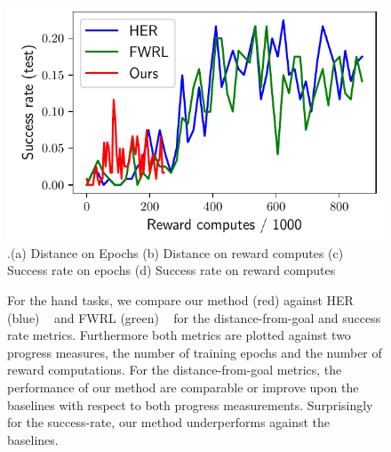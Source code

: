 \begin{figure}
  \includegraphics[width=\frac\columnwidth]{media/res/6efc1de-path_reward_low_thresh_chosen-HandManipulatePenRotate-v0-ddpg/reward_computes-test/success_rate.pdf}
  {.\tiny\color{blue}\hspace{0.8cm}(a) Distance on Epochs \hspace{1.05cm}(b) Distance on
    reward computes
    \hspace{0.70cm} (c) Success rate on epochs \hspace{0.9cm} (d) Success rate on reward computes}
  \caption{For the hand tasks, we compare our method (red) against HER (blue) ~\citep{andrychowicz2016learning}
    and FWRL (green) ~\citep{dhiman2018floydwarshall} for the distance-from-goal
    and success rate metrics. Furthermore both metrics are plotted
    against two progress measures, the number of training epochs and the number of reward
    computations. For the distance-from-goal metrics, the performance of
    our method are comparable or improve upon the baselines with respect
    to both progress measurements. Surprisingly for the success-rate,
    our method underperforms against the baselines. 
}%
  \label{fig:hand-results}%
\end{figure}%
% 
